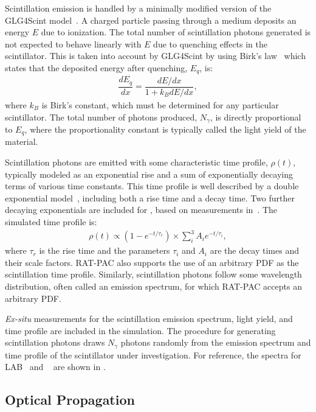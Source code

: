Scintillation emission is handled by a minimally modified version of the GLG4Scint model~\cite{glg4sim}. 
A charged particle passing through a medium deposits an energy $E$ due to ionization. 
The total number of scintillation photons generated is not expected to behave linearly with $E$ due to quenching effects in the scintillator.
This is taken into account by GLG4Scint by using Birk's law~\cite{birks} which states that the deposited energy after quenching, $E_{q}$, is:
\begin{eqnarray}
\dfrac{dE_{q}}{dx} = \dfrac{dE/dx}{1+ k_BdE/dx},
\label{eq:birk}
\end{eqnarray}
where $k_B$ is Birk's constant, which must be determined for any particular scintillator. 
The total number of  photons produced, $N_{\gamma}$, is directly proportional to $E_{q}$, where the proportionality constant is typically called the light yield of the material. 

Scintillation photons are emitted with some characteristic time profile, $\rho(t)$, typically modeled as an exponential rise and a sum of exponentially decaying terms of various time constants.
This time profile is well described by a double exponential model~\cite{mcguire_palmer}, including both a rise time and a decay time. 
Two further decaying exponentials are included for {\labppo}, based on measurements in~\cite{labppo}. The simulated time profile is:
\begin{eqnarray}
\rho(t) \propto (1 - e^{-t/\tau_r}) \times \sum^3_i A_i e^{-t/\tau_i},
\end{eqnarray}
where $\tau_r$ is the rise time and the parameters $\tau_i$ and $A_i$ are the decay times and their scale factors.
RAT-PAC also supports the use of an arbitrary PDF as the scintillation time profile.
Similarly, scintillation photons follow some wavelength distribution, often called an emission spectrum, for which RAT-PAC accepts an arbitrary PDF.

\textit{Ex-situ} measurements for the scintillation emission spectrum, light yield, and time profile are included in the simulation. 
The procedure for generating scintillation photons draws $N_{\gamma}$ photons randomly from the emission spectrum and time profile of the scintillator under investigation. 
For reference, the spectra for LAB~\cite{lab_emission} and {\labppo}~\cite{snop_private} are shown in . 


\subsection{Optical Propagation \label{sec:optics}}

